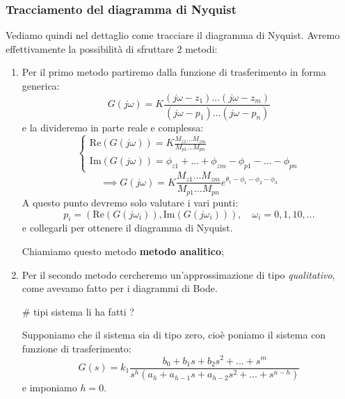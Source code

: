 \documentclass[a4paper,11pt]{article}
\begin{document}
\subsubsection{Tracciamento del diagramma di Nyquist}
Vediamo quindi nel dettaglio come tracciare il diagramma di Nyquist.
Avremo effettivamente la possibilità di sfruttare 2 metodi:
\begin{enumerate}
	\item 
		Per il primo metodo partiremo dalla funzione di trasferimento in forma generica:
		$$
		G(j \omega) = K \frac{ (j\omega - z_1) ... (j\omega - z_m) }{ (j\omega - p_1) ... (j\omega - p_n) }
		$$
		e la divideremo in parte reale e complessa:
		\[
			\begin{cases}
				\mathrm{Re}\left( G(j\omega) \right) = K \frac{M_{z1} ... M_{zm}}{M_{p1} ... M_{pn}} \\
				\mathrm{Im} \left( G(j\omega) \right) = \phi_{z1} + ... + \phi_{zm} - \phi_{p1} - ... - \phi_{pn}
			\end{cases}
		\]
		\[
			\implies
			G(j\omega) = K \frac{M_{z1} ... M_{zm}}{M_{p1} ... M_{pn}} e^{\theta_1 - \phi_1 - \phi_2 - \phi_3
			}
		\]
		A questo punto devremo solo valutare i vari punti:
		$$
		p_i = \left( \mathrm{Re}\left( G(j\omega_i) \right), \mathrm{Im}\left( G(j\omega_i) \right) \right), \quad \omega_i = 0, 1, 10, ...
		$$
		e collegarli per ottenere il diagramma di Nyquist.

		Chiamiamo questo metodo \textbf{metodo analitico};
	
	\item
		Per il secondo metodo cercheremo un'approssimazione di tipo \textit{qualitativo}, come avevamo fatto per i diagrammi di Bode.

		# tipi sistema li ha fatti ?

		Supponiamo che il sistema sia di tipo zero, cioè poniamo il sistema con funzione di trasferimento:
		$$
		G(s) = k_1 \frac{ b_0 + b_1 s + b_2 s^2 + ... + s^m }{ s^h ( a_h + a_{h - 1} s + a_{h - 2} s^2 + ... + s^{n - h} ) }
		$$
		e imponiamo $h = 0$.


\end{enumerate}
\end{document}
